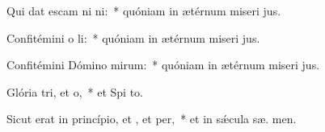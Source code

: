 \item Qui dat escam ni ni:~* quóniam in ætérnum miseri jus.
\item Confitémini o li:~* quóniam in ætérnum miseri jus.
\item Confitémini Dómino mirum:~* quóniam in ætérnum miseri jus.
\item Glória tri, et o,~* et Spi to.
\item Sicut erat in princípio, et , et per,~* et in sǽcula sæ. men.

